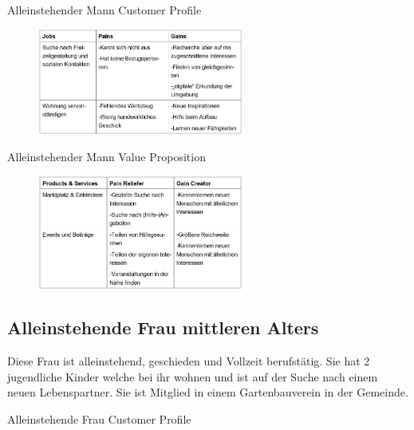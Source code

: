 \begin{table}[H]
    \centering
    \caption{Alleinstehender Mann Customer Profile}
\end{table}

\begin{figure}[H]
    \centering
    \includegraphics[width=0.6\textwidth]{figures/andre/alleinstehendercustomerprofile.JPG}
    \label{fig:alleinstehendercustomerprofile}
\end{figure}

\begin{table}[H]
    \centering
    \caption{Alleinstehender Mann Value Proposition}
\end{table}

\begin{figure}[H]
    \centering
    \includegraphics[width=0.6\textwidth]{figures/andre/alleinstehendervalueproposition.JPG}
    \label{fig:alleinstehendervalueproposition}
\end{figure}

\subsection*{Alleinstehende Frau mittleren Alters}
Diese Frau ist alleinstehend, geschieden und Vollzeit berufstätig. Sie hat 2 jugendliche Kinder welche bei ihr wohnen und ist auf der Suche nach einem neuen Lebenspartner. Sie ist Mitglied in einem Gartenbauverein in der Gemeinde.

\begin{table}[H]
    \centering
    \caption{Alleinstehende Frau Customer Profile}
\end{table}

